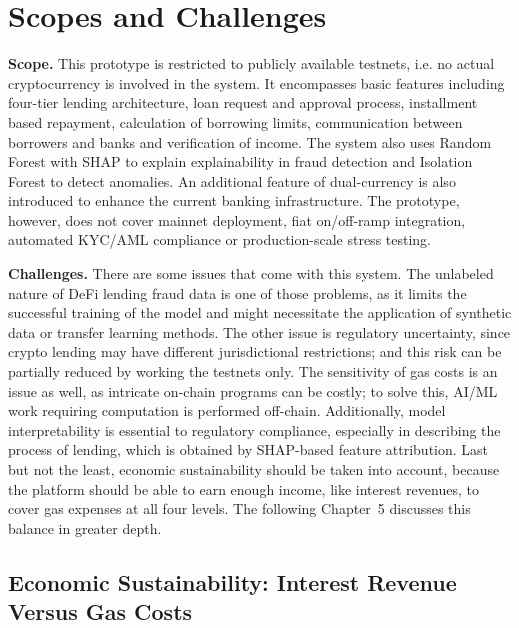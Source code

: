\documentclass[12pt,a4paper]{report}
\begin{document}
\section{Scopes and Challenges}

\textbf{Scope.} This prototype is restricted to publicly available testnets, i.e. no actual cryptocurrency is involved in the system. It encompasses basic features including four-tier lending architecture, loan request and approval process, installment based repayment, calculation of borrowing limits, communication between borrowers and banks and verification of income. The system also uses Random Forest with SHAP to explain explainability in fraud detection and Isolation Forest to detect anomalies. An additional feature of dual-currency is also introduced to enhance the current banking infrastructure. The prototype, however, does not cover mainnet deployment, fiat on/off-ramp integration, automated KYC/AML compliance or production-scale stress testing.

\textbf{Challenges.} There are some issues that come with this system. The unlabeled nature of DeFi lending fraud data is one of those problems, as it limits the successful training of the model and might necessitate the application of synthetic data or transfer learning methods. The other issue is regulatory uncertainty, since crypto lending may have different jurisdictional restrictions; and this risk can be partially reduced by working the testnets only. The sensitivity of gas costs is an issue as well, as intricate on-chain programs can be costly; to solve this, AI/ML work requiring computation is performed off-chain. Additionally, model interpretability is essential to regulatory compliance, especially in describing the process of lending, which is obtained by SHAP-based feature attribution. Last but not the least, economic sustainability should be taken into account, because the platform should be able to earn enough income, like interest revenues, to cover gas expenses at all four levels. The following Chapter~5 discusses this balance in greater depth.

\subsection{Economic Sustainability: Interest Revenue Versus Gas Costs}
\end{document}
